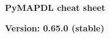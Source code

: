 \documentclass[9pt,landscape]{article}
\begin{document}
\raggedright
\footnotesize
\begin{center}
     \Huge{\textbf{PyMAPDL cheat sheet}} \\
\end{center}
\begin{center}
     \small{\textbf{Version: 0.65.0 (stable)}} \\
\end{center}
\vspace{-0.15cm}
\noindent\makebox[\linewidth]{\rule{\paperwidth}{2pt}}
\end{document}
